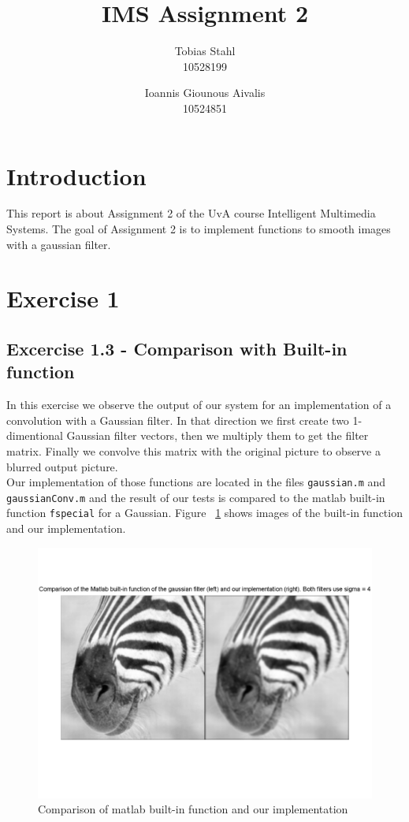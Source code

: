 \documentclass[11pt]{article}
\title{
	\textbf{IMS Assignment 2}
}
\author{Tobias Stahl \\ 10528199 \and Ioannis Giounous Aivalis \\ 10524851 }
\begin{document}
\maketitle

\section{Introduction}
This report is about Assignment 2 of the UvA course Intelligent Multimedia Systems. The goal of Assignment 2 is to implement functions to smooth images with a gaussian filter.

\section{Exercise 1}

\subsection{Excercise 1.3 - Comparison with Built-in function}
In this exercise we observe the output of our system for an implementation of a convolution with a Gaussian filter. In that direction we first create two 1-dimentional Gaussian filter vectors, then we multiply them to get the filter matrix. Finally we convolve this matrix with the original picture to observe a blurred output picture.\\
Our implementation of those functions are located in the files \texttt{gaussian.m} and \texttt{gaussianConv.m} and the result of our tests is compared to the matlab built-in function \texttt{fspecial} for a Gaussian. Figure ~\ref{comp} shows images of the built-in function and our implementation.
\begin{figure}[h!]
\includegraphics[scale=0.6]{comparison.png}
\caption{Comparison of matlab built-in function and our implementation }
\label{comp}
\end{figure}
\end{document}
